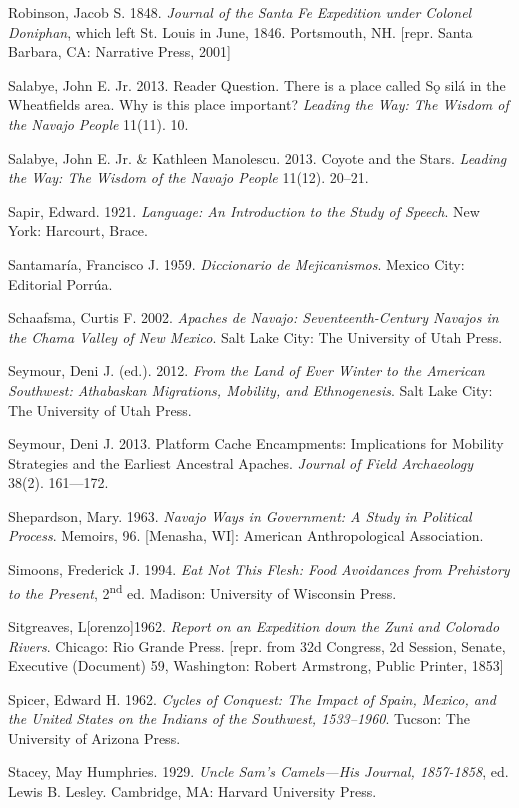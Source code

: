 Robinson, Jacob S. 1848.  \textit{ Journal of the Santa Fe Expedition under Colonel Doniphan}, which left St. Louis in June, 1846.   Portsmouth, NH.  [repr. Santa Barbara, CA:  Narrative Press, 2001]

Salabye, John E. Jr.  2013.  Reader Question.  There is a place called Sǫ silá in the Wheatfields area. Why is this place important?  \textit{Leading the Way: The Wisdom of the Navajo People} 11(11). 10.

Salabye, John E. Jr.  \& Kathleen Manolescu. 2013.  Coyote and the Stars.  \textit{Leading the Way: The Wisdom of the Navajo People} 11(12). 20--21.

Sapir, Edward. 1921. \textit{Language: An Introduction to the Study of Speech}.  New York:  Harcourt, Brace.

Santamaría, Francisco J.  1959.  \textit{Diccionario de Mejicanismos}.  Mexico City:  Editorial Porrúa.

Schaafsma, Curtis F.  2002.  \textit{Apaches de Navajo: Seventeenth-Century Navajos in the Chama Valley of New Mexico}.  Salt Lake City: The University of Utah Press.

Seymour, Deni J. (ed.).  2012.  \textit{From the Land of Ever Winter to the American Southwest: Athabaskan Migrations, Mobility, and Ethnogenesis}.  Salt Lake City:  The University of Utah Press.

Seymour, Deni J. 2013.  Platform Cache Encampments: Implications for Mobility Strategies and the Earliest Ancestral Apaches.  \textit{Journal of Field Archaeology} 38(2). 161---172.

Shepardson, Mary. 1963.  \textit{Navajo Ways in Government: A Study in Political Process}.  Memoirs, 96.  [Menasha, WI]:  American Anthropological Association.

Simoons, Frederick J. 1994.  \textit{Eat Not This Flesh: Food Avoidances from Prehistory to the Present}, 2\textsuperscript{nd} ed.  Madison:  University of Wisconsin Press.

Sitgreaves, L[orenzo]1962.  \textit{Report on an Expedition down the Zuni and Colorado Rivers}.  Chicago:  Rio Grande Press.  [repr. from 32d Congress, 2d Session, Senate, Executive (Document) 59, Washington:  Robert Armstrong, Public Printer, 1853]

Spicer, Edward H.  1962.  \textit{Cycles of Conquest:  The Impact of Spain, Mexico, and the United States on the Indians of the Southwest, 1533--1960}.  Tucson:  The University of Arizona Press.

Stacey, May Humphries. 1929.  \textit{Uncle Sam’s Camels—His Journal, 1857-1858}, ed. Lewis B. Lesley.  Cambridge, MA:  Harvard University Press.

